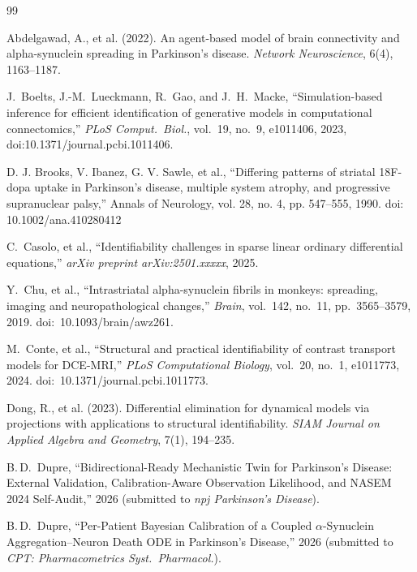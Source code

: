\begin{thebibliography}{99}

Abdelgawad, A., et al. (2022).
\newblock An agent-based model of brain connectivity and alpha-synuclein spreading in Parkinson's disease.
\newblock \emph{Network Neuroscience}, 6(4), 1163--1187.

J.~Boelts, J.-M.~Lueckmann, R.~Gao, and J.~H.~Macke, ``Simulation-based inference for efficient identification of generative models in computational connectomics,'' \textit{PLoS Comput.\ Biol.}, vol.~19, no.~9, e1011406, 2023, doi:10.1371/journal.pcbi.1011406.

 D. J. Brooks, V. Ibanez, G. V. Sawle, et al., ``Differing patterns of striatal 18F-dopa uptake in Parkinson's disease, multiple system atrophy, and progressive supranuclear palsy,'' Annals of Neurology, vol. 28, no. 4, pp. 547--555, 1990. doi: 10.1002/ana.410280412

C.~Casolo, et al., ``Identifiability challenges in sparse linear ordinary differential equations,'' \textit{arXiv preprint arXiv:2501.xxxxx}, 2025.

Y.~Chu, et al., ``Intrastriatal alpha-synuclein fibrils in monkeys: spreading, imaging and neuropathological changes,'' \textit{Brain}, vol.~142, no.~11, pp.~3565--3579, 2019. doi:~10.1093/brain/awz261.

M.~Conte, et al., ``Structural and practical identifiability of contrast transport models for DCE-MRI,'' \textit{PLoS Computational Biology}, vol.~20, no.~1, e1011773, 2024. doi:~10.1371/journal.pcbi.1011773.

Dong, R., et al. (2023).
\newblock Differential elimination for dynamical models via projections with applications to structural identifiability.
\newblock \emph{SIAM Journal on Applied Algebra and Geometry}, 7(1), 194--235.

 B.\,D.~Dupre, ``Bidirectional-Ready Mechanistic Twin for Parkinson's Disease: External Validation, Calibration-Aware Observation Likelihood, and NASEM 2024 Self-Audit,'' 2026 (submitted to \textit{npj Parkinson's Disease}).

 B.\,D.~Dupre, ``Per-Patient Bayesian Calibration of a Coupled $\alpha$-Synuclein Aggregation--Neuron Death ODE in Parkinson's Disease,'' 2026 (submitted to \textit{CPT: Pharmacometrics Syst.\ Pharmacol.}).


\end{thebibliography}
